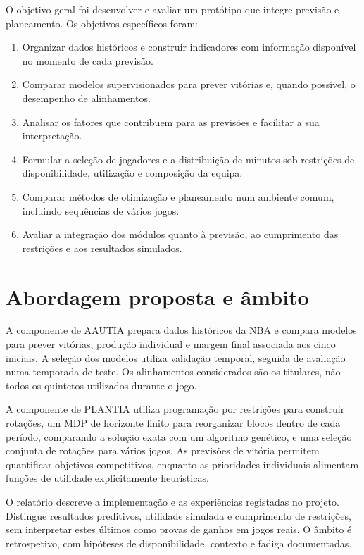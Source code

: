 O objetivo geral foi desenvolver e avaliar um protótipo que integre previsão
e planeamento. Os objetivos específicos foram:

\begin{enumerate}
  \item Organizar dados históricos e construir indicadores com informação
  disponível no momento de cada previsão.
  \item Comparar modelos supervisionados para prever vitórias e, quando
  possível, o desempenho de alinhamentos.
  \item Analisar os fatores que contribuem para as previsões e facilitar
  a sua interpretação.
  \item Formular a seleção de jogadores e a distribuição de minutos sob
  restrições de disponibilidade, utilização e composição da equipa.
  \item Comparar métodos de otimização e planeamento num ambiente comum,
  incluindo sequências de vários jogos.
  \item Avaliar a integração dos módulos quanto à previsão, ao cumprimento
  das restrições e aos resultados simulados.
\end{enumerate}

\section{Abordagem proposta e âmbito}

A componente de AAUTIA prepara dados históricos da NBA e compara modelos
para prever vitórias, produção individual e margem final associada aos
cinco iniciais. A seleção dos modelos utiliza validação temporal, seguida
de avaliação numa temporada de teste. Os alinhamentos considerados são
os titulares, não todos os quintetos utilizados durante o jogo.

A componente de PLANTIA utiliza programação por restrições para construir
rotações, um MDP de horizonte finito para reorganizar blocos dentro de cada
período, comparando a solução exata com um algoritmo genético, e uma
seleção conjunta de rotações para vários jogos. As previsões
de vitória permitem quantificar objetivos competitivos, enquanto as
prioridades individuais alimentam funções de utilidade explicitamente
heurísticas.

O relatório descreve a implementação e as experiências registadas no
projeto. Distingue resultados preditivos, utilidade simulada e cumprimento
de restrições, sem interpretar estes últimos como provas de ganhos em
jogos reais. O âmbito é retrospetivo, com hipóteses de disponibilidade,
contexto e fadiga documentadas.

